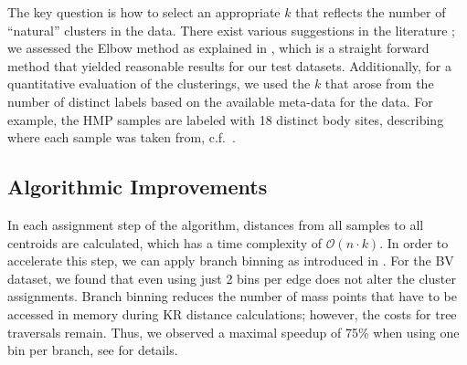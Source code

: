 The key question is how to select an appropriate $k$
that reflects the number of ``natural'' clusters in the data.
There exist various suggestions in the literature
\cite{Thorndike1953,Rousseeuw1987,Bischof1999,Pelleg2000,Tibshirani2001,Hamerly2004};
we assessed the Elbow method \cite{Thorndike1953} as explained in ,
which is a straight forward method that yielded reasonable results for our test datasets.
Additionally, for a quantitative evaluation of the clusterings,
we used the $k$ that arose from the number of distinct labels based on the available meta-data for the data.
For example, the \ac{HMP} samples are labeled with \num{18} distinct body sites,
describing where each sample was taken from, c.f.~.


\subsection{Algorithmic Improvements}
\label{ch:Clustering:sec:PhylogeneticKmeans:sub:AlgorithmicImprovements}

In each assignment step of the algorithm, distances from all samples to all centroids are calculated,
which has a time complexity of $\mathcal{O}(n \cdot k)$.
In order to accelerate this step, we can apply branch binning
as introduced in .
For the \ac{BV} dataset, we found that even using just \num{2} bins per edge does not alter the cluster assignments.
Branch binning reduces the number of mass points that have to be accessed in memory during KR distance calculations;
however, the costs for tree traversals remain.
Thus, we observed a maximal speedup of 75\% when using one bin per branch,
see  for details.

